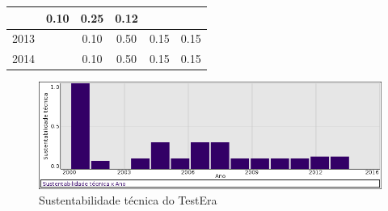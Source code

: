 \begin{table}[H]
\begin{tabular}{| l | c | c | c | c | c |}
          &
          0.10
          &
          0.25
          &
          0.12
          &
          \\
\hline
            2013
          &
          
          &
          0.10
          &
          0.50
          &
          0.15
          &
            {\color{red} 0.15}
          \\
\hline
            2014
          &
          
          &
          0.10
          &
          0.50
          &
          0.15
          &
            {\color{red} 0.15}
          \\
\hline
\end{tabular}
\end{table}

\begin{figure}[h]
  \center
  \includegraphics[scale=0.50]{result-documents/charts/testera.png}
  \caption{Sustentabilidade técnica do TestEra}
\end{figure}


